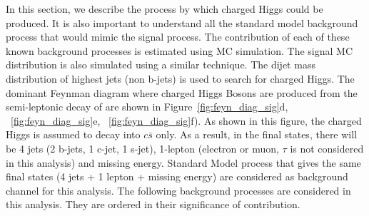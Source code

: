 
In this section, we describe the process by which charged Higgs could be produced. It is
also important to understand all the standard model background process that would mimic
the signal process. The contribution of each of these known background processes is estimated
using MC simulation. The signal MC distribution is also simulated using a similar technique.
The dijet mass distribution of highest \pt jets (non b-jets) is used to search for charged 
Higgs. The dominant Feynman diagram where charged Higgs Bosons are produced from the semi-leptonic 
decay of \ttbar are shown in Figure~\ref{fig:feyn_diag_sig}d, ~\ref{fig:feyn_diag_sig}e, 
~\ref{fig:feyn_diag_sig}f). As shown in this figure, the charged Higgs is assumed to decay into 
$c\bar{s}$ only. As a result, in the final states, there will be 4 jets (2 b-jets, 1 c-jet, 1
s-jet), 1-lepton (electron or muon, $\tau$ is not considered in this analysis) and missing energy.
Standard Model process that gives the same final states (4 jets + 1 lepton + missing energy) are considered as 
background channel for this analysis. The following background processes are considered in this
analysis. They are ordered in their significance of contribution.
